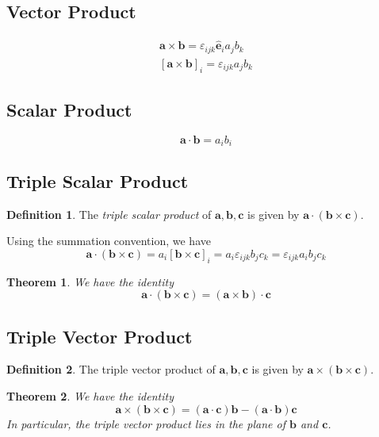\documentclass{article}
\newtheorem*{thm}{Theorem}
\theoremstyle{definition}
\theoremstyle{definition}
\newtheorem*{defn}{Definition}
\theoremstyle{remark}
\newcommand{\veca}{\mathbf{a}}
\newcommand{\vecb}{\mathbf{b}}
\newcommand{\vecc}{\mathbf{c}}
\newcommand{\bhat}[1]{\mathbf{\hat{#1}}}
\begin{document}
\subsection{Vector Product}

\begin{gather*}
    \veca \times \vecb = \varepsilon_{ijk} \bhat{e}_i a_j b_k \\
    [\veca \times \vecb]_i = \varepsilon_{ijk} a_j b_k
\end{gather*}

\subsection{Scalar Product}

\begin{equation*}
    \veca \cdot \vecb = a_i b_i
\end{equation*}

\subsection{Triple Scalar Product}

\begin{defn}
    The \emph{triple scalar product} of $\veca, \vecb, \vecc$ is given by $\veca \cdot (\vecb \times \vecc)$.
\end{defn}
Using the summation convention, we have
\begin{equation*}
    \veca \cdot (\vecb \times \vecc)
    = a_i [\vecb \times \vecc]_i
    = a_i \varepsilon_{ijk} b_j c_k
    = \varepsilon_{ijk} a_i b_j c_k
\end{equation*}

\begin{thm}
We have the identity
\begin{equation*}
    \veca \cdot (\vecb \times \vecc) = (\veca \times \vecb) \cdot \vecc
\end{equation*}
\end{thm}

\subsection{Triple Vector Product}

\begin{defn}
    The triple vector product of $\veca, \vecb, \vecc$ is given by $\veca \times (\vecb \times \vecc)$.
\end{defn}

\begin{thm}
We have the identity
\begin{equation*}
    \veca \times (\vecb \times \vecc) = (\veca \cdot \vecc) \vecb - (\veca \cdot \vecb) \vecc
\end{equation*}
In particular, the triple vector product lies in the plane of $\vecb$ and $\vecc$.
\end{thm}
\end{document}
